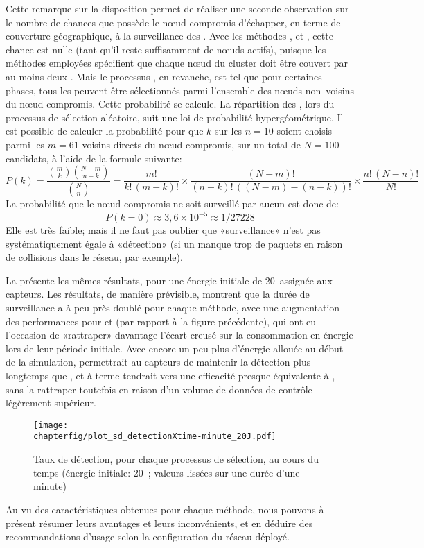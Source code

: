 Cette remarque sur la disposition permet de réaliser une seconde observation sur le nombre de chances que possède le nœud compromis d'échapper, en terme de couverture géographique, à la surveillance des \cns.
Avec les méthodes \ideres, \iddemx et \iddems, cette chance est nulle (tant qu'il reste suffisamment de nœuds actifs), puisque les méthodes employées spécifient que chaque nœud du cluster doit être couvert par au moins deux \cns.
Mais le processus \idrand, en revanche, est tel que pour certaines phases, tous les \cns peuvent être sélectionnés parmi l'ensemble des nœuds non~voisins du nœud compromis.
Cette probabilité se calcule.
La répartition des \cns, lors du processus de sélection aléatoire, suit une loi de probabilité hypergéométrique.
Il est possible de calculer la probabilité pour que $k$ \cns sur les $n=10$ soient choisis parmi les $m=61$ voisins directs du nœud compromis, sur un total de $N=100$ candidats, à l'aide de la formule suivante:
$$P(k) = \frac{{m\choose k}{N-m\choose n-k}}{{N\choose n}}=
\frac{m!}{k!\,(m-k)!}\times\frac{(N-m)!}{(n-k)!\,((N-m)-(n-k))!}\times\frac{n!\,(N-n)!}{N!}$$
La probabilité que le nœud compromis ne soit surveillé par aucun \cn est donc de:
$$P(k=0)\approx3,6\times10^{-5}\approx1/27228$$
Elle est très faible; mais il ne faut pas oublier que «surveillance» n'est pas systématiquement égale à «détection» (si un \cn manque trop de paquets en raison de collisions dans le réseau, par exemple).

La  présente les mêmes résultats, pour une énergie initiale de 20~\joule assignée aux capteurs.
Les résultats, de manière prévisible, montrent que la durée de surveillance a à peu près doublé pour chaque méthode, avec une augmentation des performances pour \iddemx et \iddems (par rapport à la figure précédente), qui ont eu l'occasion de «rattraper» davantage l'écart creusé sur la consommation en énergie lors de leur période initiale.
Avec encore un peu plus d'énergie allouée au début de la simulation, \iddemx permettrait au capteurs de maintenir la détection plus longtemps que \ideres, et à terme tendrait vers une efficacité presque équivalente à \idrand, sans la rattraper toutefois en raison d'un volume de données de contrôle légèrement supérieur.
\begin{figure}[p]
    \centering
    \texttt{[image: \\chapterfig/plot\_sd\_detectionXtime-minute\_20J.pdf]}
    \caption[Taux de détection au cours du temps (énergie initiale: 20~\joule)]{Taux de détection, pour chaque processus de sélection, au cours du temps (énergie initiale: 20~\joule; valeurs lissées sur une durée d'une minute)}\label{sd:fig:detec-min-20J}
\end{figure}

Au vu des caractéristiques obtenues pour chaque méthode, nous pouvons à présent résumer leurs avantages et leurs inconvénients, et en déduire des recommandations d'usage selon la configuration du réseau déployé.
\pagebreak %

